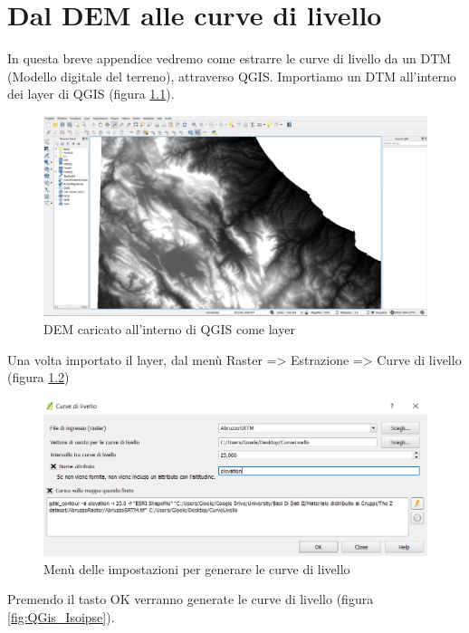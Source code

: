 
\chapter{Dal DEM alle curve di livello}
\label{ch:dem_to_isoipse}

In questa breve appendice vedremo come estrarre le curve di livello da un DTM (Modello digitale del terreno), attraverso QGIS.
Importiamo un DTM  all'interno dei layer di QGIS  (figura \ref{fig:QGis_DEM}).
\begin{figure}[H]
	\centering
	\includegraphics[width=1\textwidth]{images/QgisLivello1}
	\caption{DEM caricato all'interno di QGIS come layer}
	\label{fig:QGis_DEM}
\end{figure}
Una volta importato il layer, dal menù Raster => Estrazione => Curve di livello  (figura \ref{fig:QGis_Livello})
\begin{figure}[H]
	\centering
	\includegraphics[width=1\textwidth]{images/CurveLivelloQGIS}
	\caption{Menù delle impostazioni per generare le curve di livello}
	\label{fig:QGis_Livello}
\end{figure}
Premendo il tasto OK verranno generate le curve di livello  (figura \ref{fig:QGis_Isoipse}).
